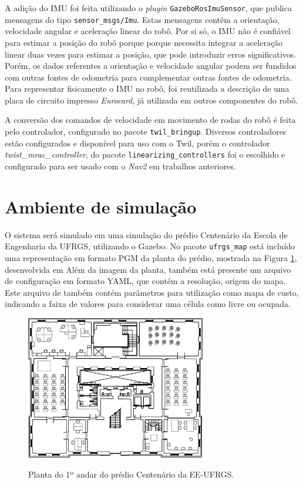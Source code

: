\documentclass[repeatfields,xlists,xpacks,oneside,yearsonly]{ufrgscca}
\begin{document}
A adição do IMU foi feita utilizando o \textit{plugin}
\texttt{GazeboRosImuSensor}, que publica mensagens do tipo
\texttt{sensor\_msgs/Imu}. Estas mensagens contêm a orientação,
velocidade angular e aceleração linear do robô. Por si só, o IMU não
é confiável para estimar a posição do robô porque porque necessita
integrar a aceleração linear duas vezes para estimar a posição, que
pode introduzir erros significativos. Porém, os dados referentes a
orientação e velocidade angular podem ser fundidos com outras fontes
de odometria para complementar outras fontes de odometria. Para
representar fisicamente o IMU no robô, foi reutilizada a descrição de
uma placa de circuito impresso \textit{Eurocard}, já utilizada em
outros componentes do robô.

A conversão dos comandos de velocidade em movimento de rodas do robô
é feita pelo controlador, configurado no pacote
\texttt{twil\_bringup}. Diversos controladores estão configurados e
disponível para uso com o Twil, porém o controlador
\textit{twist\_mrac\_controller}, do pacote
\texttt{linearizing\_controllers} foi o escolhido e configurado para
ser usado com o \textit{Nav2} em trabalhos anteriores.

\section{Ambiente de simulação}

O sistema será simulado em uma simulação do prédio Centenário da
Escola de Engenharia da UFRGS, utilizando o Gazebo. No pacote
\texttt{ufrgs\_map} está incluído uma representação em formato PGM da
planta do prédio, mostrada na Figura \ref{fig:planta_centenario},
desenvolvida em \textcite{petry_tcc} Além da imagem da planta, também
está presente um arquivo de configuração em formato YAML, que contém
a resolução, origem do mapa. Este arquivo de também contém parâmetros
para utilização como mapa de custo, indicando a faixa de valores para
considerar uma célula como livre ou ocupada.

\begin{figure}[h]
    {
        \centering
        \caption{Planta do 1º andar do prédio Centenário da EE-UFRGS.}
        \label{fig:planta_centenario}
        \includegraphics[width=0.7\textwidth]{centenario_floor_plan.png}\\
    }
    {}
\end{figure}
\end{document}
